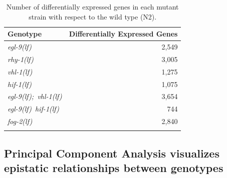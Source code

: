 \documentclass[9pt,twocolumn,twoside]{pnas-new}
\newcommand{\gene}[1]{\mbox{\emph{#1}}}
\newcommand{\fog}{\gene{fog-2(lf)}}
\newcommand{\egl}{\gene{egl-9(lf)}}
\newcommand{\rhy}{\gene{rhy-1(lf)}}
\newcommand{\vhl}{\gene{vhl-1(lf)}}
\newcommand{\eglvhl}{\gene{egl-9(lf); vhl-1(lf)}}
\newcommand{\eglhif}{\gene{egl-9(lf) hif-1(lf)}}
\newcommand{\hif}{\gene{hif-1(lf)}}
\newcommand{\egln}{2,549}
\newcommand{\rhyn}{3,005}
\newcommand{\vhln}{1,275}
\newcommand{\eglvhln}{3,654}
\newcommand{\hifn}{1,075}
\newcommand{\eglhifn}{744}
\newcommand{\fogn}{2,840}
\begin{document}
\begin{table}[tbhp]
  \centering
  \begin{tabular}{lr}
    \toprule{}
    Genotype & Differentially Expressed Genes\\
    \midrule{}\egl{} & \egln{}\\
    \rhy{} & \rhyn{}\\
    \vhl{} & \vhln{}\\
    \hif{} & \hifn{}\\
    \eglvhl{} & \eglvhln{}\\
    \eglhif{} & \eglhifn{}\\
    \fog{} & \fogn{}\\
    \bottomrule{}
  \end{tabular}
  \caption{Number of differentially expressed genes in each mutant strain with
  respect to the wild type (N2).}
\label{tab:genes}
\end{table}

\subsection*{Principal Component Analysis visualizes epistatic relationships
             between genotypes}
\label{sub:Clustering}
\end{document}
